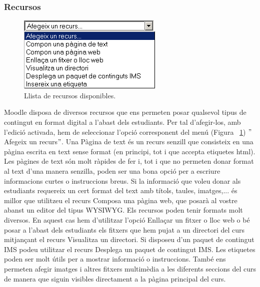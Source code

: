 \documentclass[a4paper]{report}  %
\begin{document}
\subsubsection{Recursos}
\begin{figure}[H] %
\begin{flushleft}
\includegraphics{img/MoodleRecurs.png}
\caption[List caption]{Llista de recursos disponibles.} 
\label{fig:MoodleRecurs}
\end{flushleft}
\end{figure}
Moodle disposa de diversos recursos que ens permeten posar qualsevol tipus de contingut en format digital a l'abast dels estudiants. Per tal d'afegir-los, amb l'edició activada, hem de seleccionar l'opció corresponent del menú (Figura ~\ref{fig:MoodleRecurs}) $"$Afegeix un recurs$"$. 
Una Pàgina de text és un recurs senzill que consisteix en una pàgina escrita en text sense format (en principi, tot i que accepta etiquetes html). Les pàgines de text són molt ràpides de fer i, tot i que no permeten donar format al text d'una manera senzilla, poden ser una bona opció per a escriure informacions curtes o instruccions breus. Si la informació que voleu donar als estudiants requereix un cert format del text amb títols, taules, imatges,... és millor que utilitzeu el recurs Composa una pàgina web, que posarà al vostre abanst un editor del tipus WYSIWYG. 
Els recursos poden tenir formats molt diversos. En aquest cas hem d'utilitzar l'opció Enllaçar un fitxer o lloc web o bé posar a l'abast dels estudiants els fitxers que hem pujat a un directori del curs mitjançant el recurs Visualitza un directori. Si disposeu d'un paquet de contingut IMS podeu utilitzar el recurs Desplega un paquet de contingut IMS. 
Les etiquetes poden ser molt útils per a mostrar informació o instruccions. També ens permeten afegir imatges i altres fitxers multimèdia a les diferents seccions del curs de manera que siguin visibles directament a la pàgina principal del curs. 
\end{document}
